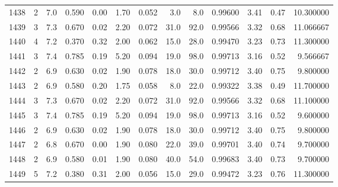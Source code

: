 \begin{tabular}{lrrrrrrrrrrrr}
1438 &        2 &            7.0 &             0.590 &         0.00 &            1.70 &      0.052 &                  3.0 &                   8.0 &  0.99600 &  3.41 &       0.47 &  10.300000 \\
1439 &        3 &            7.3 &             0.670 &         0.02 &            2.20 &      0.072 &                 31.0 &                  92.0 &  0.99566 &  3.32 &       0.68 &  11.066667 \\
1440 &        4 &            7.2 &             0.370 &         0.32 &            2.00 &      0.062 &                 15.0 &                  28.0 &  0.99470 &  3.23 &       0.73 &  11.300000 \\
1441 &        3 &            7.4 &             0.785 &         0.19 &            5.20 &      0.094 &                 19.0 &                  98.0 &  0.99713 &  3.16 &       0.52 &   9.566667 \\
1442 &        2 &            6.9 &             0.630 &         0.02 &            1.90 &      0.078 &                 18.0 &                  30.0 &  0.99712 &  3.40 &       0.75 &   9.800000 \\
1443 &        2 &            6.9 &             0.580 &         0.20 &            1.75 &      0.058 &                  8.0 &                  22.0 &  0.99322 &  3.38 &       0.49 &  11.700000 \\
1444 &        3 &            7.3 &             0.670 &         0.02 &            2.20 &      0.072 &                 31.0 &                  92.0 &  0.99566 &  3.32 &       0.68 &  11.100000 \\
1445 &        3 &            7.4 &             0.785 &         0.19 &            5.20 &      0.094 &                 19.0 &                  98.0 &  0.99713 &  3.16 &       0.52 &   9.600000 \\
1446 &        2 &            6.9 &             0.630 &         0.02 &            1.90 &      0.078 &                 18.0 &                  30.0 &  0.99712 &  3.40 &       0.75 &   9.800000 \\
1447 &        2 &            6.8 &             0.670 &         0.00 &            1.90 &      0.080 &                 22.0 &                  39.0 &  0.99701 &  3.40 &       0.74 &   9.700000 \\
1448 &        2 &            6.9 &             0.580 &         0.01 &            1.90 &      0.080 &                 40.0 &                  54.0 &  0.99683 &  3.40 &       0.73 &   9.700000 \\
1449 &        5 &            7.2 &             0.380 &         0.31 &            2.00 &      0.056 &                 15.0 &                  29.0 &  0.99472 &  3.23 &       0.76 &  11.300000 \\

\end{tabular}
